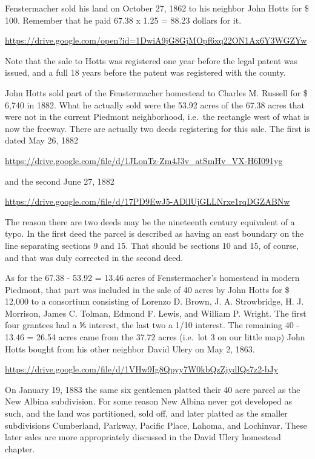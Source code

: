 \documentclass[
  12pt,
]{book}
\begin{document}
Fenstermacher sold his land on October 27, 1862 to his neighbor John Hotts for \$ 100. Remember that he paid 67.38 x 1.25 = 88.23 dollars for it.

\url{https://drive.google.com/open?id=1DwiA9jG8GjMOpf6xq22ON1Ax6Y3WGZYw}

Note that the sale to Hotts was registered one year before the legal patent was issued, and a full 18 years before the patent was registered with the county.

John Hotts sold part of the Fenstermacher homestead to Charles M. Russell for \$ 6,740 in 1882. What he actually sold were the 53.92 acres of the 67.38 acres that were not in the current Piedmont neighborhood, i.e.~the rectangle west of what is now the freeway. There are actually two deeds registering for this sale. The first is dated May 26, 1882

\url{https://drive.google.com/file/d/1JLonTz-Zm4J3v_atSmHv_VX-H6I091yg}

and the second June 27, 1882

\url{https://drive.google.com/file/d/17PD9EwJ5-ADllUjGLLNrxe1rqDGZABNw}

The reason there are two deeds may be the nineteenth century equivalent of a typo. In the first deed the parcel is described as having an east boundary on the line separating sections 9 and 15. That should be sections 10 and 15, of course, and that was duly corrected in the second deed.

As for the 67.38 - 53.92 = 13.46 acres of Fenstermacher's homestead in modern Piedmont, that part was included in the sale of 40 acres by John Hotts for \$ 12,000 to a consortium consisting of Lorenzo D. Brown, J. A. Strowbridge, H. J. Morrison, James C. Tolman, Edmond F. Lewis, and William P. Wright. The first four grantees had a ⅕ interest, the last two a 1/10 interest. The remaining 40 - 13.46 = 26.54 acres came from the 37.72 acres (i.e.~lot 3 on our little map) John Hotts bought from his other neighbor David Ulery on May 2, 1863.

\url{https://drive.google.com/file/d/1VHw9Ig8Qpyy7W0kbQzZjydlQs7z2-bJy}

On January 19, 1883 the same six gentlemen platted their 40 acre parcel as the New Albina subdivision. For some reason New Albina never got developed as such, and the land was partitioned, sold off, and later platted as the smaller subdivisions Cumberland, Parkway, Pacific Place, Lahoma, and Lochinvar. These later sales are more appropriately discussed in the David Ulery homestead chapter.
\end{document}
